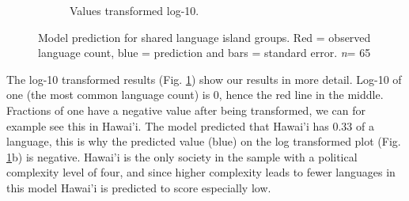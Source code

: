 \documentclass[a4paper,10pt]{article} %
\begin{document}
\begin{figure}
\begin{subfigure}{12cm}
\caption{Values transformed log-10.}
    \end{subfigure}
    \caption[Model prediction for shared language island group.]{{Model prediction for shared language island groups. Red = observed language count, blue = prediction and bars = standard error.  \emph{n}= 65}}
\label{medium_model_predict}
\end{figure}


The log-10 transformed results (Fig. \ref{medium_model_predict}) show our results in more detail. Log-10 of one (the most common language count) is 0, hence the red line in the middle. Fractions of one have a negative value after being transformed, we can for example see this in Hawai'i. The model predicted that Hawai'i has 0.33 of a language, this is why the predicted value (blue) on the log transformed plot (Fig. \ref{medium_model_predict}b) is negative. Hawai'i is the only society in the sample with a political complexity level of four, and since higher complexity leads to fewer languages in this model Hawai'i is predicted to score especially low.


\end{document}
